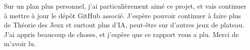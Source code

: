 Sur un plan plus personnel, j'ai particulièrement aimé ce projet, et vais continuer à mettre à jour le dépôt GitHub associé. J'espère pouvoir continuer à faire plus de Théorie des Jeux et surtout plus d'\ac{IA}, peut-être sur d'autres jeux de plateau. J'ai appris beaucoup de choses, et j'espère que ce rapport vous a plu. Merci de m'avoir lu.